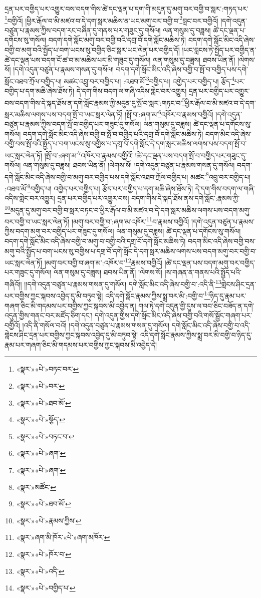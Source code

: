 དྲན་པར་བགྱིད་པར་འགྱུར་བས་བདག་གིས་ཚེ་དང་ལྡན་པ་དག་གི་མདུན་དུ་མགུ་བར་བགྱི་བ་སླར་:གཏད་པར་\footnote{«སྣར་»«པེ་»བཏང་བར་}བགྱིའོ། །ཕྱིར་རྒོལ་བ་མི་མཛའ་བ་དེ་དག་སླར་མཆིས་ན་ཡང་མགུ་བར་བགྱི་བ་\footnote{«སྣར་»«པེ་»བར་}བླང་བར་བགྱིའོ། །དགེ་འདུན་བཙུན་པ་རྣམས་ཀྱིས་བདག་རང་བཞིན་དུ་གནས་པར་གཟུང་དུ་གསོལ། ལན་གསུམ་དུ་བཟླས། ཚེ་དང་ལྡན་པ་དགོངས་སུ་གསོལ། བདག་དགེ་སློང་མགུ་བར་བགྱི་བའི་དགྲ་བོ་དགེ་སློང་མཆིས་ཏེ། བདག་དགེ་སློང་མིང་འདི་ཞེས་བགྱི་བ་མགུ་བའི་སྤྱོད་པ་བག་ཡངས་སུ་བགྱིད་ཅིང་སླར་ཡང་ལེན་པར་བགྱིད་དོ། །ཡང་བླངས་ཏེ་སྤྱོད་པར་བགྱིད་ན་ཚེ་དང་ལྡན་པས་བདག་ངོ་ཚ་བ་མ་མཆིས་པར་མི་གཟུང་དུ་གསོལ། ལན་གསུམ་དུ་བཟླས། ཐབས་ཡིན་ནོ། །ལེགས་སོ། །དགེ་འདུན་བཙུན་པ་རྣམས་གསན་དུ་གསོལ། བདག་དགེ་སློང་མིང་འདི་ཞེས་བགྱི་བ་སྤོ་བ་བགྱིད་པས་དགེ་སློང་འཐབ་ཀྲོལ་བགྱིད་པ། མཚང་འབྲུ་བར་བགྱིད་པ། :འཐབ་མོ་\footnote{«སྣར་»«པེ་»ཐབ་མོ་}བགྱིད་པ། འགྱེད་པར་བགྱིད་པ། རྩོད་\footnote{«སྣར་»«པེ་»སྩོད་}པར་བགྱིད་པ་དག་མཆི་ཞེས་ཐོས་ཏེ། དེ་དག་གིས་བདག་ལ་གཞི་འདིས་གླེང་བར་འགྱུར། དྲན་པར་བགྱིད་པར་འགྱུར་བས་བདག་གིས་དེ་སྐད་ཐོས་ན་དགེ་སློང་རྣམས་ཀྱི་མདུན་དུ་སྤོ་བ་སླར་:གཏང་བ་\footnote{«སྣར་»«པེ་»བཏང་བ་}ཕྱིར་རྒོལ་བ་མི་མཛའ་བ་དེ་དག་སླར་མཆིས་ལགས་པས་བདག་སྤོ་བ་ཡང་སླར་ལེན་ཏོ། །སྤོ་བ་:ཞག་མ་\footnote{«སྣར་»«པེ་»ཞག་}འཁོར་བ་རྣམས་བགྱིའོ། །དགེ་འདུན་བཙུན་པ་རྣམས་ཀྱིས་བདག་སྤོ་བ་བགྱིད་པར་གཟུང་དུ་གསོལ། ལན་གསུམ་དུ་བཟླས། ཚེ་དང་ལྡན་པ་དགོངས་སུ་གསོལ། བདག་དགེ་སློང་མིང་འདི་ཞེས་བགྱི་བ་སྤོ་བ་བགྱིད་པའི་དགྲ་བོ་དགེ་སློང་མཆིས་ཏེ། བདག་མིང་འདི་ཞེས་བགྱི་བས་སྤོ་བའི་སྤྱོད་པ་བག་ཡངས་སུ་བགྱིས་པ་དགྲ་བོ་དགེ་སློང་དེ་དག་སླར་མཆིས་ལགས་པས་བདག་སྤོ་བ་ཡང་སླར་ལེན་ཏོ། །སྤོ་བ་:ཞག་མ་\footnote{«སྣར་»«པེ་»ཞག་}འཁོར་བ་རྣམས་བགྱིའོ། །ཚེ་དང་ལྡན་པས་བདག་སྤོ་བ་བགྱིད་པར་གཟུང་དུ་གསོལ། ལན་གསུམ་དུ་བཟླས། ཐབས་ཡིན་ནོ། །ལེགས་སོ། །དགེ་འདུན་བཙུན་པ་རྣམས་གསན་དུ་གསོལ། བདག་དགེ་སློང་མིང་འདི་ཞེས་བགྱི་བ་མགུ་བར་བགྱིད་པས་དགེ་སློང་འཐབ་ཀྲོལ་བགྱིད་པ། མཚང་\footnote{«སྣར་»མཚོང་}འབྲུ་བར་བགྱིད་པ། :འཐབ་མོ་\footnote{«སྣར་»«པེ་»ཐབ་མོ་}བགྱིད་པ། འགྱེད་པར་བགྱིད་པ། རྩོད་པར་བགྱིད་པ་དག་མཆི་ཞེས་ཐོས་ཏེ། དེ་དག་གིས་བདག་ལ་གཞི་འདིས་གླེང་བར་འགྱུར། དྲན་པར་བགྱིད་པར་འགྱུར་བས། བདག་གིས་དེ་སྐད་ཐོས་ནས་དགེ་སློང་:རྣམས་ཀྱི་\footnote{«སྣར་»«པེ་»རྣམས་ཀྱིས་}མདུན་དུ་མགུ་བར་བགྱི་བ་སླར་བཏང་བ་ཕྱིར་རྒོལ་བ་མི་མཛའ་བ་དེ་དག་སླར་མཆིས་ལགས་པས་བདག་མགུ་བར་བགྱི་བ་ཡང་སླར་ལེན་ཏོ། །མགུ་བར་བགྱི་བ་:ཞག་མ་འཁོར་\footnote{«སྣར་»ཞག་མི་ཁོར་«པེ་»ཞག་མཁོར་}བ་རྣམས་བགྱིའོ། །དགེ་འདུན་བཙུན་པ་རྣམས་ཀྱིས་བདག་མགུ་བར་བགྱིད་པར་གཟུང་དུ་གསོལ། ལན་གསུམ་དུ་བཟླས། ཚེ་དང་ལྡན་པ་དགོངས་སུ་གསོལ། བདག་དགེ་སློང་མིང་འདི་ཞེས་བགྱི་བ་མགུ་བ་བགྱི་བའི་དགྲ་བོ་དགེ་སློང་མཆིས་ཏེ། བདག་མིང་འདི་ཞེས་བགྱི་བས་མགུ་བའི་སྤྱོད་པ་བག་ཡངས་སུ་བགྱིས་པ་དགྲ་བོ་དགེ་སློང་དེ་དག་སླར་མཆིས་ལགས་པས་བདག་མགུ་བར་བགྱི་བ་ཡང་སླར་ལེན་ཏོ། །མགུ་བར་བགྱི་བ་ཞག་མ་:འཁོར་བ་\footnote{«སྣར་»«པེ་»ཁོར་བ་}རྣམས་བགྱིའོ། །ཚེ་དང་ལྡན་པས་བདག་མགུ་བར་བགྱིད་པར་གཟུང་དུ་གསོལ། ལན་གསུམ་དུ་བཟླས། ཐབས་ཡིན་ནོ། །ལེགས་སོ། །ས་གཞན་ན་གནས་པའི་སྤྱོད་པའི་གཞིའོ།། །།དགེ་འདུན་བཙུན་པ་རྣམས་གསན་དུ་གསོལ། དགེ་སློང་མིང་འདི་ཞེས་བགྱི་བ་:འདི་ནི་\footnote{«སྣར་»«པེ་»འདི་}གླེངས་ཤིང་དྲན་པར་བགྱིས་ཀྱང་སྐབས་འབྱེད་དུ་མི་བཏུབ་སྟེ། འདི་དགེ་སློང་རྣམས་ཀྱིས་སྨྲ་བར་མི་:བགྱི་བ་\footnote{«སྣར་»«པེ་»བགྱིད་པ་}ཉིད་དུ་རྣམ་པར་གཞག་ཅིང་མི་གདམས་པར་བགྱིས་ཀྱང་སྐབས་མི་འབྱེད་ན། གལ་ཏེ་དགེ་འདུན་གྱི་དུས་ལ་བབ་ཅིང་བཟོད་ན་དགེ་འདུན་གྱིས་གནང་བར་མཛོད་ཅིག་དང་། དགེ་འདུན་གྱིས་དགེ་སློང་མིང་འདི་ཞེས་བགྱི་བའི་གསོ་སྦྱོང་གཞག་པར་བགྱིའོ། །འདི་ནི་གསོལ་བའོ། །དགེ་འདུན་བཙུན་པ་རྣམས་གསན་དུ་གསོལ། དགེ་སློང་མིང་འདི་ཞེས་བགྱི་བ་འདི་གླེངས་ཤིང་དྲན་པར་བགྱིས་ཀྱང་སྐབས་འབྱེད་དུ་མི་བཏུབ་སྟེ། འདི་དགེ་སློང་རྣམས་ཀྱིས་སྨྲ་བར་མི་བགྱི་བ་ཉིད་དུ་རྣམ་པར་གཞག་ཅིང་མི་གདམས་པར་བགྱིས་ཀྱང་སྐབས་མི་འབྱེད་དེ། 